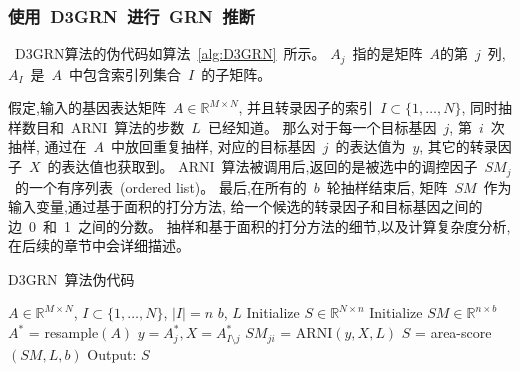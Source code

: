 \subsubsection{使用~D3GRN~进行~GRN~推断}

~D3GRN算法的伪代码如算法~\ref{alg:D3GRN}~所示。
$A_j$~指的是矩阵~$A$的第~$j$~列, 
$A_I$~是~$A$~中包含索引列集合~$I$~的子矩阵。

假定,输入的基因表达矩阵~$A \in \mathbb{R}^{M \times N}$, 
并且转录因子的索引~$I \subset \{1,\ldots,N\}$, 
同时抽样数目和~ARNI~算法的步数~$L$~已经知道。
那么对于每一个目标基因~$j$, 第~$i$~次抽样,
通过在~$A$~中放回重复抽样,
对应的目标基因~$j$~的表达值为~$y$, 
其它的转录因子~$X$~的表达值也获取到。
ARNI~算法被调用后,返回的是被选中的调控因子~$SM_j$~的一个有序列表~(ordered list)。
最后,在所有的~$b$~轮抽样结束后,
矩阵~$SM$~作为输入变量,通过基于面积的打分方法,
给一个候选的转录因子和目标基因之间的边~0~和~1~之间的分数。
抽样和基于面积的打分方法的细节,以及计算复杂度分析,在后续的章节中会详细描述。
 
\begin{algorithm}
  \caption{D3GRN~算法伪代码}
  \label{alg:D3GRN}
  \begin{algorithmic}[1]
  \Require $A \in \mathbb{R}^{M \times N}$, $I \subset \{1,\ldots,N\}$, 
            $|I| = n$                                   
  \Ensure $b$, $L$                                      
  \State Initialize $S \in \mathbb{R}^{N \times n}$     
  \State Initialize $SM \in \mathbb{R}^{n \times b}$     
                                     
        \State $A^{*}$ = resample$(A)$                  
                                              
        \State $y = A^{*}_j, X = A^{*}_{I\setminus j}$
        \State $SM_{ji}$ = ARNI$(y,X,L)$                    
        \EndFor
  \EndFor           
  \State $S$ = area-score$(SM,L,b)$                      
  \State Output: $S$                                    
\end{algorithmic}
\end{algorithm}


